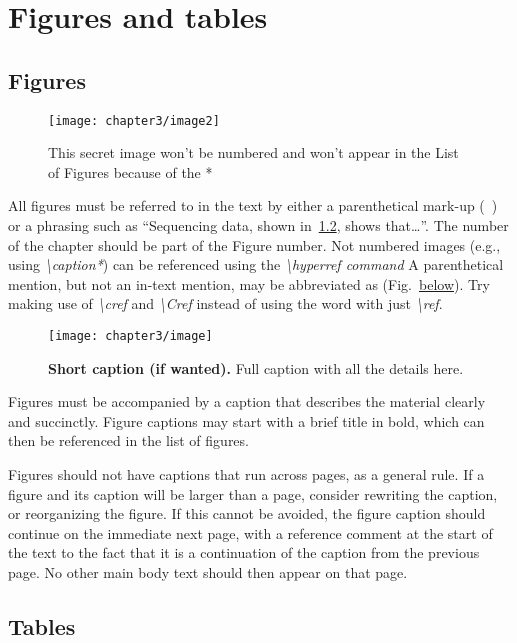 \chapter{Figures and tables}\label{ch:3}

\section{Figures}
\begin{figure}[H]
\center%
\texttt{[image: chapter3/image2]}
\caption*{This secret image won't be numbered and won't appear in the List of Figures because of the *}\label{fig:2}
\end{figure}
All figures must be referred to in the text by either a parenthetical mark-up (~) or a phrasing such as “Sequencing data, shown in~\cref{fig:1}, shows that\ldots''. The number of the chapter should be part of the Figure number. Not numbered images (e.g., using \textit{\textbackslash{caption*}}) can be referenced using the \textit{\textbackslash{hyperref command}}
A parenthetical mention, but not an in-text mention, may be abbreviated as (Fig.~\hyperref[fig:2]{below}). Try making use of \textit{\textbackslash{cref}} and \textit{\textbackslash{Cref}} instead of using the word \textit{} with just \textit{\textbackslash{ref}}.

\begin{figure}
\center%
\texttt{[image: chapter3/image]}
\caption[Short caption for List of Figures]{{\bfseries Short caption (if wanted).} Full caption with all the details here.}\label{fig:1}
\end{figure}
Figures must be accompanied by a caption that describes the material clearly and succinctly.
Figure captions may start with a brief title in bold, which can then be referenced in the list of figures.

Figures should not have captions that run across pages, as a general rule.
If a figure and its caption will be larger than a page, consider rewriting the caption, or reorganizing the figure.
If this cannot be avoided, the figure caption should continue on the immediate next page, with a reference comment at the start of the text to the fact that it is a continuation of the caption from the previous page.
No other main body text should then appear on that page.
\section{Tables}


